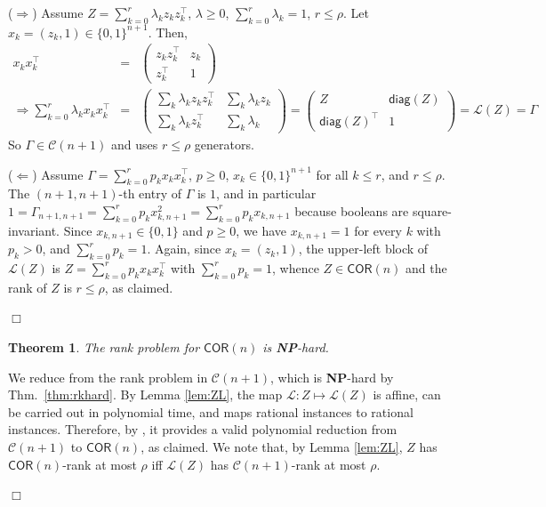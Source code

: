 \documentclass[envcountsect,envcountsame]{svjour3}
\theoremstyle{changebreak}                %
\newtheorem{theorem}[result]{Theorem}
\newenvironment{proof}
 {{\sl Proof.}\hspace*{1 ex}}%
 {{\nopagebreak\hspace*{\fill}$\Box$\par\vspace{12pt}}}
\newcommand{\transpose}[1]{{#1}^{\top}}
\newcommand{\COR}[1]{\mathsf{COR}(#1)}
\newcommand{\CONX}[1]{\mathcal{C}(#1)}
\newcommand{\diag}[1]{\mathsf{diag}(#1)}
\begin{document}
\begin{proof}
  ($\Rightarrow$) Assume $Z=\sum_{k=0}^r\lambda_k z_k\transpose{z}_k$, $\lambda\ge 0$, $\sum_{k=0}^r\lambda_k=1$, $r\le\rho$. Let $x_k=(z_k,1)\in\{0,1\}^{n+1}$. Then,
  \begin{eqnarray*}
    x_k\transpose{x}_k &=& \left(\begin{array}{cc} z_k\transpose{z}_k & z_k \\ \transpose{z}_k & 1 \end{array}\right) \\
    \Rightarrow \sum_{k=0}^r \lambda_k x_k\transpose{x}_k &=& \left(\begin{array}{cc} \sum_k\lambda_k z_k\transpose{z}_k & \sum_k \lambda_k z_k \\
      \sum_k\lambda_k \transpose{z}_k & \sum_k\lambda_k\end{array}\right) =
      \left(\begin{array}{cc} Z & \diag{Z} \\ \transpose{\diag{Z}} & 1\end{array}\right)=\mathscr{L}(Z)=\Gamma
  \end{eqnarray*}
  So $\Gamma\in\CONX{n+1}$ and uses $r\le\rho$ generators.

  ($\Leftarrow$) Assume $\Gamma=\sum_{k=0}^r p_k x_k\transpose{x}_k$, $p\ge 0$, $x_k\in\{0,1\}^{n+1}$ for all $k\le r$, and $r\le\rho$. The $(n+1,n+1)$-th entry of $\Gamma$ is $1$, and in particular $1=\Gamma_{n+1,n+1}=\sum_{k=0}^r p_k x_{k,n+1}^2 = \sum_{k=0}^r p_k x_{k,n+1}$ because booleans are square-invariant. Since $x_{k,n+1}\in\{0,1\}$ and $p\ge 0$, we have $x_{k,n+1}=1$ for every $k$ with $p_k>0$, and $\sum_{k=0}^r p_k=1$. Again, since $x_k=(z_k,1)$, the upper-left block of $\mathscr{L}(Z)$ is $Z=\sum_{k=0}^r p_k x_k\transpose{x}_k$ with $\sum_{k=0}^r p_k=1$, whence $Z\in\COR{n}$ and the rank of $Z$ is $r\le\rho$, as claimed. 
\end{proof}    

\begin{theorem}
  The rank problem for $\COR{n}$ is \textbf{NP}-hard.\label{thm:corrank}
\end{theorem}
\begin{proof}
  We reduce from the rank problem in $\CONX{n+1}$, which is \textbf{NP}-hard by Thm.~\ref{thm:rkhard}. By Lemma \ref{lem:ZL}, the map $\mathscr{L}:Z\mapsto \mathscr{L}(Z)$ is affine, can be carried out in polynomial time, and maps rational instances to rational instances. Therefore, by \cite{gls}, it provides a valid polynomial reduction from $\CONX{n+1}$ to $\COR{n}$, as claimed. We note that, by Lemma \ref{lem:ZL}, $Z$ has $\COR{n}$-rank at most $\rho$ iff $\mathscr{L}(Z)$ has $\CONX{n+1}$-rank at most $\rho$.
\end{proof}
\end{document}
